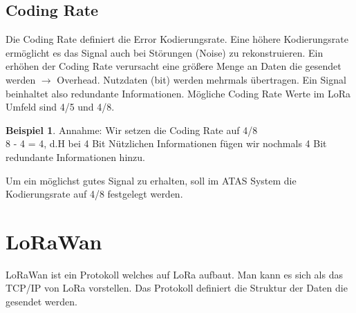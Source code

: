 \documentclass[11pt,english,german]{report}
\theoremstyle{definition}
\newtheorem{exmp}{Beispiel}[subsection]
\begin{document}
\newpage
\subsection{Coding Rate}
Die Coding Rate definiert die Error Kodierungsrate. Eine höhere Kodierungsrate ermöglicht es das Signal auch bei Störungen (Noise) zu rekonstruieren. Ein erhöhen der Coding Rate verursacht eine größere Menge an Daten die gesendet werden $\rightarrow$ Overhead. Nutzdaten (bit) werden mehrmals übertragen. Ein Signal beinhaltet also redundante Informationen. Mögliche Coding Rate Werte im LoRa Umfeld sind 4/5 und 4/8.
\begin{exmp}
	Annahme: Wir setzen die Coding Rate auf 4/8\\
	8 - 4 = 4, d.H bei 4 Bit Nützlichen Informationen fügen wir nochmals 4 Bit redundante Informationen hinzu.
\end{exmp}
\noindent
Um ein möglichst gutes Signal zu erhalten, soll im ATAS System die Kodierungsrate auf 4/8 festgelegt werden.

\newpage
\section{LoRaWan}
LoRaWan ist ein Protokoll welches auf LoRa aufbaut. Man kann es sich als das TCP/IP von LoRa vorstellen. Das Protokoll definiert die Struktur der Daten die gesendet werden.
\end{document}
